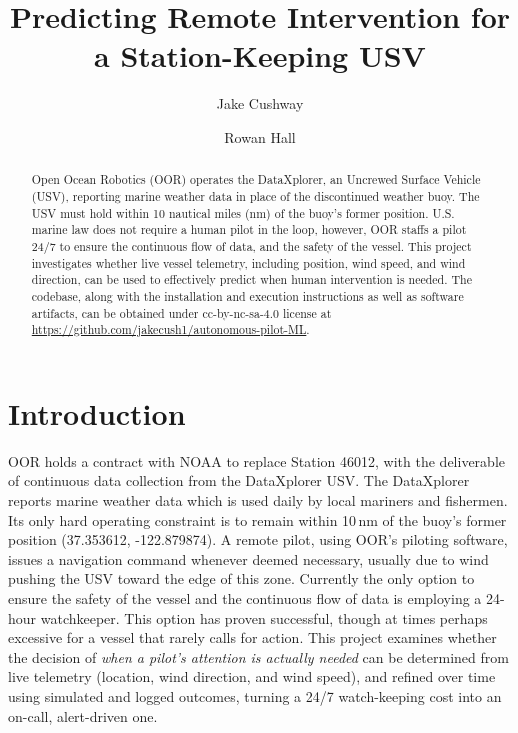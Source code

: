 \documentclass[sigconf]{acmart}
\begin{document}
\title{Predicting Remote Intervention for a Station-Keeping USV}
\author{Jake Cushway}

\author{Rowan Hall}


\begin{abstract}
{Open Ocean Robotics (OOR) operates the DataXplorer, an Uncrewed Surface Vehicle (USV), reporting marine weather data in place of the discontinued weather buoy. The USV must hold within 10 nautical miles (nm) of the buoy's former position. U.S. marine law does not require a human pilot in the loop, however, OOR staffs a pilot 24/7 to ensure the continuous flow of data, and the safety of the vessel.  This project investigates whether live vessel telemetry, including position, wind speed, and wind direction, can be used to effectively predict when human intervention is needed.  The codebase, along with the installation and execution instructions as well as software artifacts, can be obtained under cc-by-nc-sa-4.0 license at \url{https://github.com/jakecush1/autonomous-pilot-ML}.}
\end{abstract}


\maketitle 
\section{Introduction}
{OOR holds a contract with NOAA to replace Station 46012, with the deliverable of
continuous data collection from the DataXplorer USV. The DataXplorer reports
marine weather data which is used daily by local mariners and fishermen.  Its only hard operating constraint is to remain within 10\,nm of the buoy's former
position (37.353612, -122.879874). A remote pilot, using OOR's piloting
software, issues a navigation command whenever deemed necessary, usually due to  wind pushing the USV toward the edge of this zone. Currently the only option to ensure the safety of the vessel and the continuous flow of data is employing a 24-hour watchkeeper.  This option has proven successful, though at times perhaps excessive for a vessel that rarely calls for action. This project examines whether the decision of \textit{when a pilot's attention is actually needed} can be determined from live telemetry (location, wind direction, and wind speed), and refined over time using simulated and logged outcomes, turning a 24/7 watch-keeping cost into an on-call, alert-driven one.}
\end{document}

